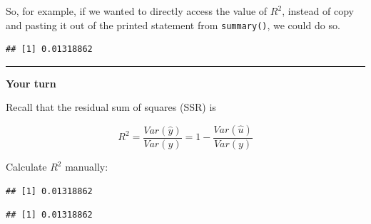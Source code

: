 \documentclass[]{book}
\newenvironment{Shaded}{\begin{snugshade}}{\end{snugshade}}
\newcommand{\DecValTok}[1]{\textcolor[rgb]{0.00,0.00,0.81}{#1}}
\newcommand{\KeywordTok}[1]{\textcolor[rgb]{0.13,0.29,0.53}{\textbf{#1}}}
\newcommand{\NormalTok}[1]{#1}
\newcommand{\OperatorTok}[1]{\textcolor[rgb]{0.81,0.36,0.00}{\textbf{#1}}}
\newcommand{\StringTok}[1]{\textcolor[rgb]{0.31,0.60,0.02}{#1}}
\begin{document}
So, for example, if we wanted to directly access the value of \(R^2\),
instead of copy and pasting it out of the printed statement from
\texttt{summary()}, we could do so.

\begin{Shaded}
\end{Shaded}

\begin{verbatim}
## [1] 0.01318862
\end{verbatim}

\begin{center}\rule{0.5\linewidth}{\linethickness}\end{center}

\textbf{Your turn}

Recall that the residual sum of squares (SSR) is

\begin{equation}
R^2 = \frac{Var(\hat{y})}{Var(y)} = 1 - \frac{Var(\hat{u})}{Var(y)} 
\end{equation}

Calculate \(R^2\) manually:

\begin{Shaded}
\end{Shaded}

\begin{verbatim}
## [1] 0.01318862
\end{verbatim}

\begin{Shaded}
\end{Shaded}

\begin{verbatim}
## [1] 0.01318862
\end{verbatim}
\end{document}
